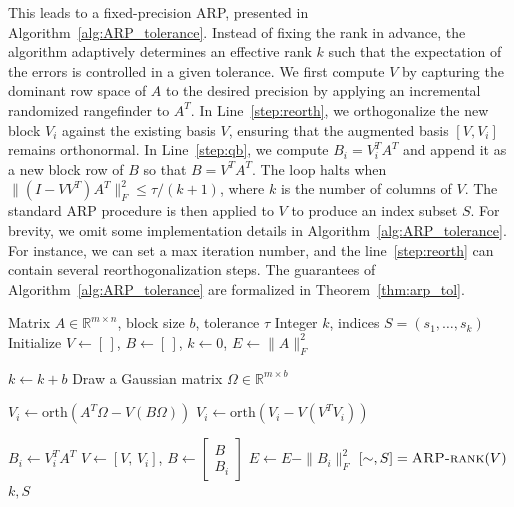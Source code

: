 \documentclass[11pt]{article}
\newcommand{\<}{\langle}
\renewcommand{\>}{\rangle}
\begin{document}
This leads to a fixed-precision ARP, presented in Algorithm~\ref{alg:ARP_tolerance}. Instead of fixing the rank in advance, the algorithm adaptively determines an effective rank $k$ such that the expectation of the errors is controlled in a given tolerance. We first compute $V$ by capturing the dominant row space of $A$ to the desired precision by applying an incremental randomized rangefinder to $A^T$. In Line~\ref{step:reorth}, we orthogonalize the new block $V_i$ against the existing basis $V$, ensuring that the augmented basis $[V,V_i]$ remains orthonormal. In Line~\ref{step:qb}, we compute $B_i = V_i^TA^T$ and append it as a new block row of $B$ so that $B= V^TA^T$. The loop halts when $\|(I - VV^T)A^T\|_F^2\leq \tau/(k+1)$, where $k$ is the number of columns of $V$. The standard ARP procedure is then applied to $V$ to produce an index subset $S$. For brevity, we omit some implementation details in Algorithm~\ref{alg:ARP_tolerance}. For instance, we can set a max iteration number, and the line~\ref{step:reorth} can contain several reorthogonalization steps. The guarantees of Algorithm~\ref{alg:ARP_tolerance} are formalized in Theorem~\ref{thm:arp_tol}.

\begin{algorithm}[H]
\caption{Adaptive Randomized Pivoting with Fixed Precision}
\label{alg:ARP_tolerance}
\begin{algorithmic}[1]

\Require Matrix $A \in \mathbb{R}^{m \times n}$, block size $b$, tolerance $\tau$
\Ensure Integer $k$, indices $S = (s_1, \ldots, s_k)$
\State Initialize $V \gets [\,]$, $B \gets [\,]$, $k \gets 0$, $E \gets \|A\|_F^2$

    \State $k \gets k + b$
    \State Draw a Gaussian matrix $\Omega \in \mathbb{R}^{m \times b}$
    
    \State $V_i \gets \mathrm{orth}\!\left(A^{T}\Omega - V(B\Omega)\right)$
    \State $V_i \gets \mathrm{orth}\!\left(V_i - V(V^T V_i)\right)$ \label{step:reorth}
    
    \State $B_i \gets V_i^T A^T$ \label{step:qb}
    \State $V \gets [V,\, V_i]$, \quad $B \gets \begin{bmatrix} B \\ B_i \end{bmatrix}$
    \State $E \gets E -  \|B_i\|_F^2$
\EndWhile
\State $[\sim,S] = \textsc{ARP-rank}(V)$ \label{step:arp}
\State \Return $k, S$
\EndFunction
\end{algorithmic}
\end{algorithm}
\end{document}
